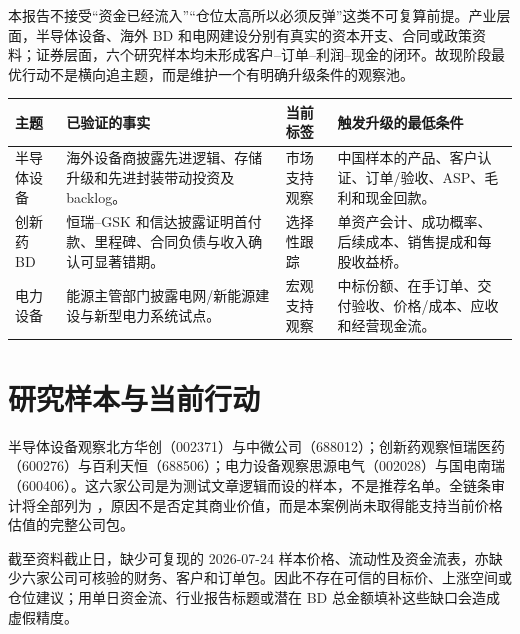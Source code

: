 \begin{houseviewbox}[结论先行]
本报告不接受“资金已经流入”“仓位太高所以必须反弹”这类不可复算前提。产业层面，半导体设备、海外 BD 和电网建设分别有真实的资本开支、合同或政策资料；证券层面，六个研究样本均未形成客户--订单--利润--现金的闭环。故现阶段最优行动不是横向追主题，而是维护一个有明确升级条件的观察池。
\end{houseviewbox}

\begin{exhibitbox}[主题结论与行为边界]
\small
\begin{tabularx}{\exhibitboxwidth}{L{2.3cm}X L{2.1cm}X}
\toprule
主题 & 已验证的事实 & 当前标签 & 触发升级的最低条件\\ \midrule
半导体设备 & 海外设备商披露先进逻辑、存储升级和先进封装带动投资及 backlog。 & 市场支持观察 & 中国样本的产品、客户认证、订单/验收、ASP、毛利和现金回款。\\
创新药 BD & 恒瑞--GSK 和信达披露证明首付款、里程碑、合同负债与收入确认可显著错期。 & 选择性跟踪 & 单资产会计、成功概率、后续成本、销售提成和每股收益桥。\\
电力设备 & 能源主管部门披露电网/新能源建设与新型电力系统试点。 & 宏观支持观察 & 中标份额、在手订单、交付验收、价格/成本、应收和经营现金流。\\
\bottomrule
\end{tabularx}
\end{exhibitbox}

\section{研究样本与当前行动}
半导体设备观察北方华创（002371）与中微公司（688012）；创新药观察恒瑞医药（600276）与百利天恒（688506）；电力设备观察思源电气（002028）与国电南瑞（600406）。这六家公司是为测试文章逻辑而设的样本，不是推荐名单。全链条审计将全部列为 ，原因不是否定其商业价值，而是本案例尚未取得能支持当前价格估值的完整公司包。

\begin{riskbox}[本报告不能回答的问题]
截至资料截止日，缺少可复现的 2026-07-24 样本价格、流动性及资金流表，亦缺少六家公司可核验的财务、客户和订单包。因此不存在可信的目标价、上涨空间或仓位建议；用单日资金流、行业报告标题或潜在 BD 总金额填补这些缺口会造成虚假精度。
\end{riskbox}
